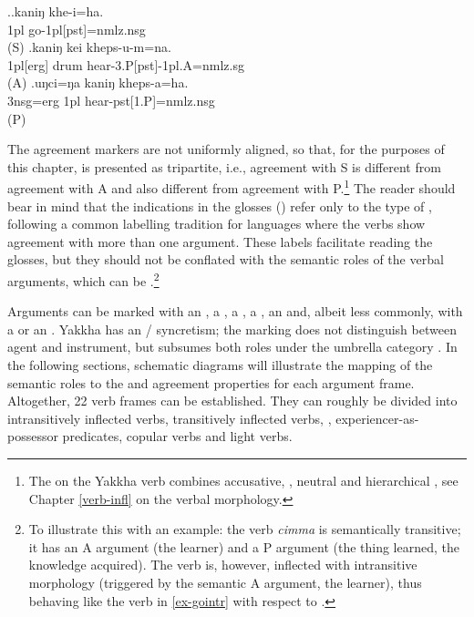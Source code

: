 \ex.\ag.\label{ex-gointr}kaniŋ khe-i=ha.\\
{\sc 1pl} go{\sc -1pl[pst]=nmlz.nsg}\\
 (S)
\bg.kaniŋ kei kheps-u-m=na.\\
{\sc 1pl[erg]} drum hear{\sc -3.P[pst]-1pl.A=nmlz.sg}\\
 (A)
\bg.uŋci=ŋa kaniŋ kheps-a=ha.\\
{\sc 3nsg=erg} {\sc 1pl}  hear{\sc -pst[1.P]=nmlz.nsg}\\
 (P)


The agreement markers are not uniformly aligned, so that, for the purposes of this chapter,  is  presented as tripartite, i.e., agreement with S is different from agreement with A and also different from agreement with P.\footnote{The  on the Yakkha verb combines accusative, , neutral and hierarchical , see Chapter \ref{verb-infl} on the verbal morphology.} The reader should bear in mind that the indications in the glosses () refer only to the type of , following a common labelling tradition for languages where the verbs show agreement with more than one argument. These labels facilitate reading  the glosses, but they should not be conflated with the semantic roles of the verbal arguments, which can be .\footnote{To illustrate this with an example: the verb \emph{cimma}  is semantically transitive; it has an A argument (the learner) and a P argument (the thing learned, the knowledge acquired). The verb  is, however, inflected with intransitive morphology (triggered by the semantic A argument, the learner), thus behaving like the verb in  \ref{ex-gointr} with respect to .} 

Arguments can be marked with an , a , a , a , an  and, albeit less commonly, with a  or an . Yakkha has an / syncretism; the  marking does not distinguish between agent and instrument, but subsumes both roles under the umbrella category  \citep{VanValinetal1996The-case}. In the following sections, schematic diagrams will illustrate the mapping of the semantic roles to the  and agreement properties for each argument frame. Altogether, 22 verb frames can be established. They can roughly be divided into intransitively inflected verbs, transitively inflected verbs, , experiencer-as-possessor predicates, copular verbs and light verbs.

